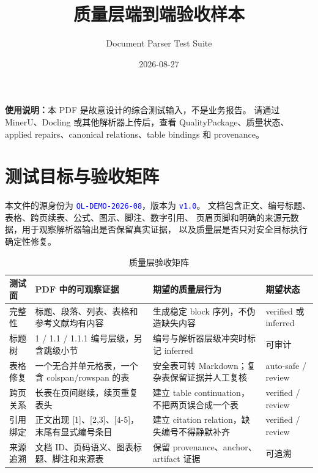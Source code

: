 \documentclass[UTF8,a4paper,11pt]{ctexart}
\title{\textbf{质量层端到端验收样本}}
\author{Document Parser Test Suite}
\date{2026-08-27}
\newcommand{\testtag}[1]{\textcolor{blue}{\texttt{#1}}}
\begin{document}
\maketitle

\begin{center}
  \colorbox{pale}{\parbox{0.92\textwidth}{
    \textbf{使用说明：}本 PDF 是故意设计的综合测试输入，不是业务报告。
    请通过 MinerU、Docling 或其他解析器上传后，查看 QualityPackage、质量状态、
    applied repairs、canonical relations、table bindings 和 provenance。
  }}
\end{center}

\vspace{4mm}
\section{测试目标与验收矩阵}

本文件的源身份为 \testtag{QL-DEMO-2026-08}，版本为 \testtag{v1.0}。
文档包含正文、编号标题、表格、跨页续表、公式、图示、脚注、数字引用、
页眉页脚和明确的来源元数据，用于观察解析器输出是否保留真实证据，
以及质量层是否只对安全目标执行确定性修复。

\begin{table}[htbp]
\centering
\caption{质量层验收矩阵}
\small
\begin{tabularx}{\textwidth}{C{0.18\textwidth} Y Y C{0.18\textwidth}}
\toprule
测试面 & PDF 中的可观察证据 & 期望的质量层行为 & 期望状态 \\
\midrule
完整性 & 标题、段落、列表、表格和参考文献均有内容 & 生成稳定 block 序列，不伪造缺失内容 & verified 或 inferred \\
标题树 & 1 / 1.1 / 1.1.1 编号层级，另含跳级小节 & 编号与解析器层级冲突时标记 inferred & 可审计 \\
表格修复 & 一个无合并单元格表，一个含 colspan/rowspan 的表 & 安全表可转 Markdown；复杂表保留证据并人工复核 & auto-safe / review \\
跨页关系 & 长表在页间继续，续页重复表头 & 建立 table continuation，不把两页误合成一个表 & verified / review \\
引用绑定 & 正文出现 [1]、[2,3]、[4-5]，末尾有显式编号条目 & 建立 citation relation，缺失编号不得静默补齐 & verified / review \\
来源追溯 & 文档 ID、页码语义、图表标题、脚注和来源表 & 保留 provenance、anchor、artifact 证据 & 可追溯 \\
\bottomrule
\end{tabularx}
\end{table}
\end{document}
